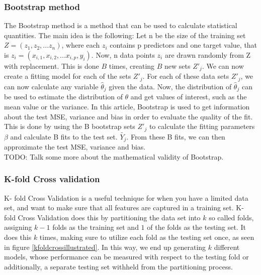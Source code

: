 \documentclass[11pt,a4paper,titlepage]{article}
\begin{document}
\subsubsection{Bootstrap method}
The Bootstrap method is a method that can be used to calculate statistical quantities. The main idea is the following: Let n be the size of the training set $Z=(z_1,z_2,...z_n)$, where each $z_i$ contains p predictors and one target value, that is $z_i=(x_{i,1},x_{i,2},...x_{i,p},y_i)$. Now, n data points $z_i$ are drawn randomly from Z with replacement. This is done $B$ times, creating $B$ new sets $Z'_j$. We can now create a fitting model for each of the sets  $Z'_j$. For each of these data sets $Z'_j$, we can now calculate any variable $\hat\theta_j$ given the data. Now, the distribution of $\hat\theta_j$ can be used to estimate the distribution of $\theta$ and get values of interest, such as the mean value or the variance. In this article, Bootstrap is used to get information about the test MSE, variance and bias in order to evaluate the quality of the fit. This is done by using the B bootstrap sets $Z'_j$ to calculate the fitting parameters $\beta$ and calculate B fits to the test set. $\tilde{Y_j}$. From these B fits, we can then approximate the test MSE, variance and bias.\\
TODO: Talk some more about the mathematical validity of Bootstrap.
\subsubsection{K-fold Cross validation}
K- fold Cross Validation is a useful technique for when you have a limited data set, and want to make sure that all features are captured in a training set. K- fold Cross Validation does this by partitioning the data set into $k$ so called folds, assigning $k-1$ folds as the training set and $1$ of the folds as the testing set. It does this $k$ times, making sure to utilize each fold as the testing set once, as seen in figure \ref{kfoldcrossillustrated}. In this way, we end up generating $k$ different models, whose performance can be measured with respect to the testing fold or additionally, a separate testing set withheld from the partitioning process.
\end{document}
